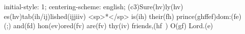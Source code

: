 initial-style: 1;
centering-scheme: english;
(c3)Sure(hv)ly(hv) es(hv)tab(ih/ij)lished(ijjiiv) <sp>*</sp> is(ih) their(fh) prince(ghffef)dom:(fe) (;) and(fd) hon(ev)ored(fv) are(fv) thy(iv) friends,(hf~) O(gf) Lord.(e)
